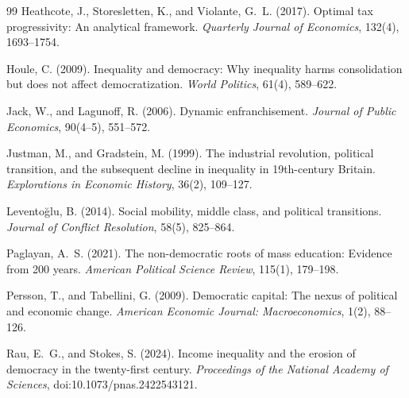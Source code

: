 \documentclass[11pt]{article}
\theoremstyle{remark}
\begin{document}
\begin{thebibliography}{99}
Heathcote, J., Storesletten, K., and Violante, G.~L. (2017).
Optimal tax progressivity: An analytical framework.
\emph{Quarterly Journal of Economics}, 132(4), 1693--1754.

Houle, C. (2009).
Inequality and democracy: Why inequality harms consolidation but does not affect democratization.
\emph{World Politics}, 61(4), 589--622.

Jack, W., and Lagunoff, R. (2006).
Dynamic enfranchisement.
\emph{Journal of Public Economics}, 90(4--5), 551--572.

Justman, M., and Gradstein, M. (1999).
The industrial revolution, political transition, and the subsequent decline in inequality in 19th-century Britain.
\emph{Explorations in Economic History}, 36(2), 109--127.

Levento\u{g}lu, B. (2014).
Social mobility, middle class, and political transitions.
\emph{Journal of Conflict Resolution}, 58(5), 825--864.

Paglayan, A.~S. (2021).
The non-democratic roots of mass education: Evidence from 200 years.
\emph{American Political Science Review}, 115(1), 179--198.

Persson, T., and Tabellini, G. (2009).
Democratic capital: The nexus of political and economic change.
\emph{American Economic Journal: Macroeconomics}, 1(2), 88--126.

Rau, E.~G., and Stokes, S. (2024).
Income inequality and the erosion of democracy in the twenty-first century.
\emph{Proceedings of the National Academy of Sciences}, doi:10.1073/pnas.2422543121.

\end{thebibliography}
\end{document}
